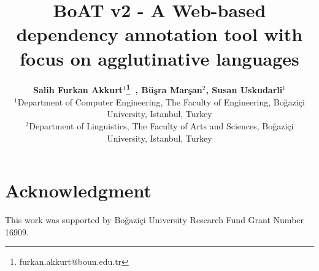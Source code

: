 \documentclass{elektr}
\title{BoAT v2 - A Web-based dependency annotation tool with focus on agglutinative languages}
\author[AKKURT et al.]{
\textbf{Salih Furkan Akkurt$^{1}$\thanks{furkan.akkurt@boun.edu.tr}~, Büşra Marşan$^{2}$, Susan Uskudarli$^{1}$}\\
$^{1}$Department of Computer Engineering, The Faculty of Engineering, Boğaziçi University, Istanbul, Turkey\\
$^{2}$Department of Linguistics, The Faculty of Arts and Sciences, Boğaziçi University, Istanbul, Turkey
\\ [1.8em]

\rec{.202}
\acc{.202}
\finv{..202}
}
\begin{document}
\maketitle












\section*{Acknowledgment}
This work was supported by Boğaziçi University Research Fund Grant Number 16909.




\newpage
\appendix

\end{document}
